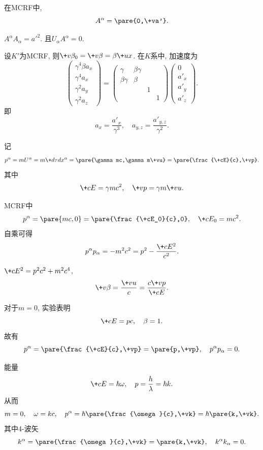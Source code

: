 \documentclass[hidelinks]{ctexart}
\begin{document}
\begin{cenum}
    \item 在MCRF中,
    \[ A^\alpha = \pare{0,\+va'}. \]
    \item $A^\alpha A_\alpha = a'^2$. 且$U_\alpha A^\alpha = 0$.
    \item 设$K'$为MCRF, 则$\+v\beta_0 = \+v\beta = \beta \+ux$. 在$K$系中, 加速度为
    \[ \begin{pmatrix}
        \gamma^4 \beta a_x \\
        \gamma^4 a_x \\
        \gamma^2 a_y \\
        \gamma^2 a_z
    \end{pmatrix} = \begin{pmatrix}
        \gamma & \beta\gamma & & \\
        \beta\gamma & \beta & & \\
        & & 1 & \\
        & & & 1
    \end{pmatrix} \begin{pmatrix}
        0 \\ a'_x \\ a'_y \\ a'_z
    \end{pmatrix}. \]
    即
    \[ a_x = \frac{a'_x}{\gamma^3},\quad a_{y,z} = \frac{a'_{y,z}}{\gamma^2}. \]
\end{cenum}
\begin{sample}
    \begin{ex}[4-动量]
        记
        \[ p^\alpha = mU^\alpha = m\+d\tau d{x^\alpha} = \pare{\gamma mc,\gamma m\+vu} = \pare{\frac{\+cE}{c},\+vp}. \]
        其中
        \[ \+cE = \gamma m c^2,\quad \+vp = \gamma m\+vu. \]
    \end{ex}
\end{sample}
\begin{cenum}
    \item MCRF中
    \[ p^\alpha = \pare{mc,0} = \pare{\frac{\+cE_0}{c},0},\quad \+cE_0 = mc^2. \]
    自乘可得
    \[ p^\alpha p_\alpha = -m^2 c^2 = p^2 - \frac{\+cE^2}{c^2}. \]
    \item $\+cE^2 = p^2 c^2 + m^2 c^4$,
    \[ \+v\beta = \frac{\+vu}{c} = \frac{c\+vp}{\+cE}. \]
    \item 对于$m=0$, 实验表明
    \[ \+cE = pc,\quad \beta  = 1. \]
    故有
    \[ p^\alpha = \pare{\frac{\+cE}{c},\+vp} = \pare{p,\+vp},\quad p^\alpha p_\alpha = 0. \]
    \item 能量
    \[ \+cE = \hbar\omega,\quad p = \frac{h}{\lambda} = \hbar k. \]
    从而
    \[ m = 0,\quad \omega = kc,\quad p^\alpha = \hbar \pare{\frac{\omega}{c},\+vk} = \hbar\pare{k,\+vk}. \]
    其中4-波矢
    \[ k^\alpha = \pare{\frac{\omega}{c},\+vk} = \pare{k,\+vk},\quad k^\alpha k_\alpha = 0. \]
\end{cenum}
\end{document}

